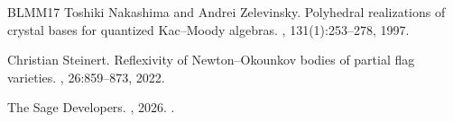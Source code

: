 \documentclass[10pt]{amsart}
\numberwithin{equation}{section}
\theoremstyle{plain}
\theoremstyle{definition}
\theoremstyle{remark}
\begin{document}
\begin{thebibliography}{BLMM17}
	Toshiki Nakashima and Andrei Zelevinsky.
	\newblock Polyhedral realizations of crystal bases for quantized {K}ac--{M}oody
	algebras.
	, 131(1):253--278, 1997.
	
	Christian Steinert.
	\newblock Reflexivity of {N}ewton--{O}kounkov bodies of partial flag varieties.
	, 26:859--873, 2022.
	
	{The Sage Developers}.
	, 2026.
	.
	
\end{thebibliography}
\end{document}
